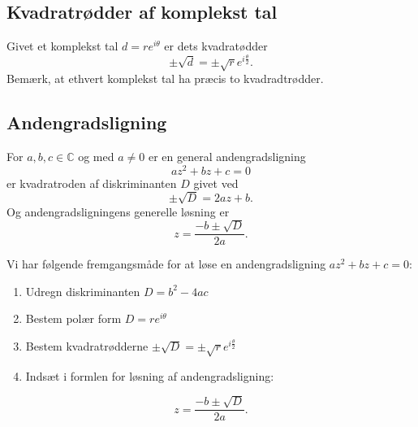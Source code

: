 \subsection{Kvadratrødder af komplekst tal}
Givet et komplekst tal $d = re^{i\theta}$ er dets kvadratødder
\[ 
  \pm \sqrt{d} = \pm \sqrt{r}e^{i \frac{\theta}{2}}
.\]
Bemærk, at ethvert komplekst tal ha præcis to kvadradtrødder.

\subsection{Andengradsligning}
For $a, b, c \in \mathbb{C}$ og med $a \neq 0$ er en general andengradsligning
\[ 
a z^2 + bz + c = 0
\]
er kvadratroden af diskriminanten $D$ givet ved
\[ 
\pm \sqrt{D} = 2a z + b
.\]
Og andengradsligningens generelle løsning er 
\[ 
z = \frac{-b \pm \sqrt{D}}{2a}
.\]

Vi har følgende fremgangsmåde for at løse en andengradsligning $a z^2 + bz + c = 0$:
\begin{enumerate}
  \item Udregn diskriminanten $D = b^2 - 4ac$
  \item Bestem polær form $D = re^{i\theta}$
  \item Bestem kvadratrødderne $\pm \sqrt{D} = \pm \sqrt{r}e^{i \frac{\theta}{2}}$
  \item Indsæt i formlen for løsning af andengradsligning:
\end{enumerate}
    \[ 
    z = \frac{-b \pm\sqrt{D}}{2a}
    .\]
